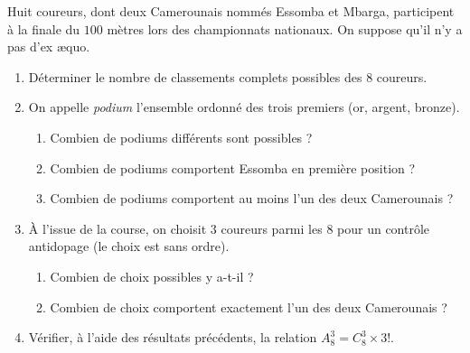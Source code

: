 \documentclass[11pt]{article}
\begin{document}
\begin{exercice}
Huit coureurs, dont deux Camerounais nommés Essomba et Mbarga, participent à la finale du $100$ mètres lors des championnats nationaux. On suppose qu'il n'y a pas d'ex æquo.
\begin{enumerate}
\item Déterminer le nombre de classements complets possibles des $8$ coureurs.
\item On appelle \emph{podium} l'ensemble ordonné des trois premiers (or, argent, bronze).
\begin{enumerate}
\item Combien de podiums différents sont possibles ?
\item Combien de podiums comportent Essomba en première position ?
\item Combien de podiums comportent au moins l'un des deux Camerounais ?
\end{enumerate}
\item À l'issue de la course, on choisit $3$ coureurs parmi les $8$ pour un contrôle antidopage (le choix est sans ordre).
\begin{enumerate}
\item Combien de choix possibles y a-t-il ?
\item Combien de choix comportent exactement l'un des deux Camerounais ?
\end{enumerate}
\item Vérifier, à l'aide des résultats précédents, la relation $A_8^3 = C_8^3 \times 3!$.
\end{enumerate}
\end{exercice}
\end{document}
